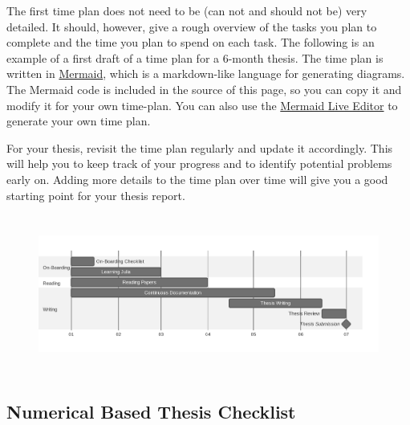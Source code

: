 \documentclass[
  letterpaper,
  DIV=11,
  numbers=noendperiod]{scrartcl}
\begin{document}
\begin{tcolorbox}[enhanced jigsaw, left=2mm, opacityback=0, title=\textcolor{quarto-callout-note-color}{\faInfo}\hspace{0.5em}{Example Time-Plan}, breakable, colback=white, toptitle=1mm, toprule=.15mm, colframe=quarto-callout-note-color-frame, bottomrule=.15mm, opacitybacktitle=0.6, bottomtitle=1mm, colbacktitle=quarto-callout-note-color!10!white, coltitle=black, titlerule=0mm, leftrule=.75mm, arc=.35mm, rightrule=.15mm]

The first time plan does not need to be (can not and should not be) very
detailed. It should, however, give a rough overview of the tasks you
plan to complete and the time you plan to spend on each task. The
following is an example of a first draft of a time plan for a 6-month
thesis. The time plan is written in
\href{https://mermaid-js.github.io/mermaid/\#/}{Mermaid}, which is a
markdown-like language for generating diagrams. The Mermaid code is
included in the source of this page, so you can copy it and modify it
for your own time-plan. You can also use the
\href{https://mermaid-js.github.io/mermaid-live-editor/}{Mermaid Live
Editor} to generate your own time plan.

For your thesis, revisit the time plan regularly and update it
accordingly. This will help you to keep track of your progress and to
identify potential problems early on. Adding more details to the time
plan over time will give you a good starting point for your thesis
report.

\begin{figure}[H]

{\centering \includegraphics[width=6in,height=2.05in]{index_files/figure-latex/mermaid-figure-2.png}

}

\end{figure}

\end{tcolorbox}

\hypertarget{sec-numerical}{%
\subsection{Numerical Based Thesis Checklist}\label{sec-numerical}}
\end{document}
